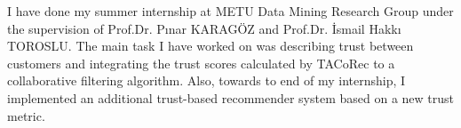 I have done my summer internship at METU Data Mining Research Group under the supervision of Prof.Dr. Pınar KARAGÖZ and Prof.Dr. İsmail Hakkı TOROSLU. The main task I have worked on was describing trust between customers and integrating the trust scores calculated by TACoRec\cite{Tacorec} to a collaborative filtering algorithm. Also, towards to end of my internship, I implemented an additional trust-based recommender system based on a new trust metric.